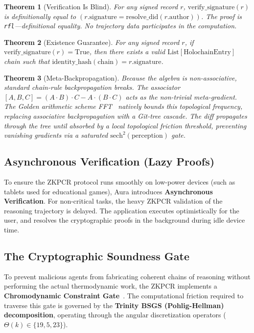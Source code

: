 \documentclass[12pt,a4paper]{article}
\newtheorem{theorem}{Theorem}[section]
\begin{document}
\begin{theorem}[Verification Is Blind]
\label{thm:blind}
For any signed record $r$, $\mathrm{verify\_signature}(r)$ is definitionally equal to $(r.\mathrm{signature} = \mathrm{resolve\_did}(r.\mathrm{author}))$. The proof is \texttt{rfl}---definitional equality. No trajectory data participates in the computation.
\end{theorem}

\begin{theorem}[Existence Guarantee]
\label{thm:existence}
For any signed record $r$, if $\mathrm{verify\_signature}(r) = \mathrm{True}$, then there exists a valid $\mathrm{List}[\mathrm{HolochainEntry}]$ chain such that $\mathrm{identity\_hash}(\mathrm{chain}) = r.\mathrm{signature}$.
\end{theorem}

\begin{theorem}[Meta-Backpropagation]
\label{thm:meta-backprop}
Because the algebra is non-associative, standard chain-rule backpropagation breaks. The associator $[A, B, C] = (A \cdot B) \cdot C - A \cdot (B \cdot C)$ acts as the non-trivial meta-gradient. The Golden arithmetic scheme FFT~\cite{PP-I-Ch7} natively bounds this topological frequency, replacing associative backpropagation with a Git-tree cascade. The diff propagates through the tree until absorbed by a local topological friction threshold, preventing vanishing gradients via a saturated $\mathrm{sech}^2(\mathrm{perception})$ gate.
\end{theorem}

\subsection{Asynchronous Verification (Lazy Proofs)}

To ensure the ZKPCR protocol runs smoothly on low-power devices (such as tablets used for educational games), Aura introduces \textbf{Asynchronous Verification}. For non-critical tasks, the heavy ZKPCR validation of the reasoning trajectory is delayed. The application executes optimistically for the user, and resolves the cryptographic proofs in the background during idle device time.

\subsection{The Cryptographic Soundness Gate}

To prevent malicious agents from fabricating coherent chains of reasoning without performing the actual thermodynamic work, the ZKPCR implements a \textbf{Chromodynamic Constraint Gate}~\cite{PP-I-Ch7}. The computational friction required to traverse this gate is governed by the \textbf{Trinity BSGS (Pohlig-Hellman) decomposition}, operating through the angular discretization operators ($\Theta(k) \in \{19, 5, 23\}$). 
\end{document}
